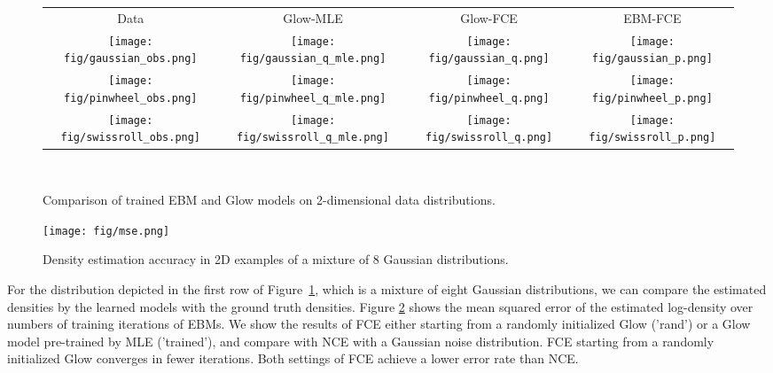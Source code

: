 \documentclass[10pt,twocolumn,letterpaper]{article}
\begin{document}
\begin{figure}
\begin{center}
   \setlength{\tabcolsep}{2.5pt}
        \begin{tabular}{cccc}
        {\footnotesize Data} & {\footnotesize Glow-MLE} & {\footnotesize Glow-FCE} & {\footnotesize EBM-FCE}\\
             \texttt{[image: fig/gaussian\_obs.png]} & \texttt{[image: fig/gaussian\_q\_mle.png]} &
             \texttt{[image: fig/gaussian\_q.png]} & \texttt{[image: fig/gaussian\_p.png]}\\
             \texttt{[image: fig/pinwheel\_obs.png]} & \texttt{[image: fig/pinwheel\_q\_mle.png]} &
             \texttt{[image: fig/pinwheel\_q.png]} & \texttt{[image: fig/pinwheel\_p.png]} \\
             \texttt{[image: fig/swissroll\_obs.png]} & \texttt{[image: fig/swissroll\_q\_mle.png]} &
             \texttt{[image: fig/swissroll\_q.png]} & \texttt{[image: fig/swissroll\_p.png]}
        \end{tabular}\\
  \end{center}
  \caption{Comparison of trained EBM and Glow models on 2-dimensional data distributions.}
  \label{fig: 2d}
\end{figure}
\begin{figure}
	\begin{center}
	\texttt{[image: fig/mse.png]}
\caption{Density estimation accuracy in 2D examples of a mixture of 8 Gaussian distributions.}
\label{fig: 2d_mse} 
	\end{center}
\end{figure}

For the distribution depicted in the first row of Figure~\ref{fig: 2d}, which is a mixture of eight Gaussian distributions, we can compare the estimated densities by the learned models with the ground truth densities. Figure \ref{fig: 2d_mse} shows the mean squared error of the estimated log-density over numbers of training iterations of EBMs. We show the results of FCE either starting from a randomly initialized Glow ('rand') or a Glow model pre-trained by MLE ('trained'), and compare with NCE with a Gaussian noise distribution. FCE starting from a randomly initialized Glow converges in fewer iterations. Both settings of FCE achieve a lower error rate than NCE. 
\end{document}
